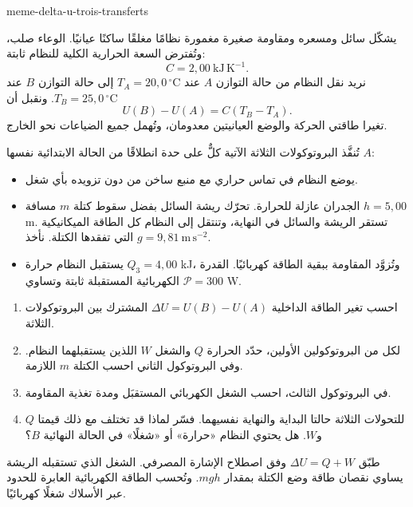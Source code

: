 \begin{exo}{meme-delta-u-trois-transferts}

يشكّل سائل ومسعره ومقاومة صغيرة مغمورة نظامًا مغلقًا ساكنًا عيانيًا. الوعاء
صلب، وتُفترض السعة الحرارية الكلية للنظام ثابتة:
\[
C=2{,}00\ \mathrm{kJ\,K^{-1}}.
\]
نريد نقل النظام من حالة التوازن $A$ عند $T_A=20{,}0\,^\circ\mathrm{C}$
إلى حالة التوازن $B$ عند $T_B=25{,}0\,^\circ\mathrm{C}$. ونقبل أن
\[
U(B)-U(A)=C(T_B-T_A).
\]
تغيرا طاقتي الحركة والوضع العيانيتين معدومان، وتُهمل جميع الضياعات نحو الخارج.

تُنفَّذ البروتوكولات الثلاثة الآتية كلٌّ على حدة انطلاقًا من الحالة الابتدائية نفسها $A$:
\begin{itemize}
\item[البروتوكول 1] يوضع النظام في تماس حراري مع منبع ساخن من دون تزويده بأي شغل.
\item[البروتوكول 2] الجدران عازلة للحرارة. تحرّك ريشة السائل بفضل سقوط كتلة $m$ مسافة $h=5{,}00$ m. تستقر الريشة والسائل في النهاية، وتنتقل إلى النظام كل الطاقة الميكانيكية التي تفقدها الكتلة. نأخذ $g=9{,}81\ \mathrm{m\,s^{-2}}$.
\item[البروتوكول 3] يستقبل النظام حرارة $Q_3=4{,}00$ kJ، وتُزوَّد المقاومة ببقية الطاقة كهربائيًا. القدرة الكهربائية المستقبلة ثابتة وتساوي $\mathcal P=300$ W.
\end{itemize}

\begin{enumerate}
\item احسب تغير الطاقة الداخلية $\Delta U=U(B)-U(A)$ المشترك بين البروتوكولات الثلاثة.
\item لكل من البروتوكولين الأولين، حدّد الحرارة $Q$ والشغل $W$ اللذين يستقبلهما النظام. وفي البروتوكول الثاني احسب الكتلة $m$ اللازمة.
\item في البروتوكول الثالث، احسب الشغل الكهربائي المستقبَل ومدة تغذية المقاومة.
\item للتحولات الثلاثة حالتا البداية والنهاية نفسيهما. فسّر لماذا قد تختلف مع ذلك قيمتا $Q$ و$W$. هل يحتوي النظام «حرارة» أو «شغلًا» في الحالة النهائية $B$؟
\end{enumerate}

\begin{indication}
طبّق $\Delta U=Q+W$ وفق اصطلاح الإشارة المصرفي. الشغل الذي تستقبله الريشة
يساوي نقصان طاقة وضع الكتلة بمقدار $mgh$. وتُحسب الطاقة الكهربائية العابرة
للحدود عبر الأسلاك شغلًا كهربائيًا.
\end{indication}


\end{exo}

